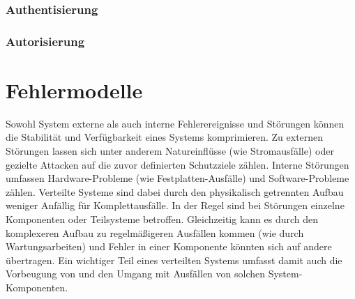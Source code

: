 \documentclass[12pt,a4paper,parskip=half]{scrreprt}
\begin{document}
\subsection{Authentisierung}


\subsection{Autorisierung}


\chapter{Fehlermodelle}
Sowohl System externe als auch interne Fehlerereignisse und Störungen können die Stabilität und Verfügbarkeit eines Systems komprimieren. Zu externen Störungen lassen sich unter anderem Natureinflüsse (wie Stromausfälle) oder gezielte Attacken auf die zuvor definierten Schutzziele zählen. Interne Störungen umfassen Hardware-Probleme (wie Festplatten-Ausfälle) und Software-Probleme zählen. Verteilte Systeme sind dabei durch den physikalisch getrennten Aufbau weniger Anfällig für Komplettausfälle. In der Regel sind bei Störungen einzelne Komponenten oder Teilsysteme betroffen. Gleichzeitig kann es durch den komplexeren Aufbau zu regelmäßigeren Ausfällen kommen (wie durch Wartungsarbeiten) und Fehler in einer Komponente könnten sich auf andere übertragen. Ein wichtiger Teil eines verteilten Systems umfasst damit auch die Vorbeugung von und den Umgang mit Ausfällen von solchen System-Komponenten.
\end{document}
